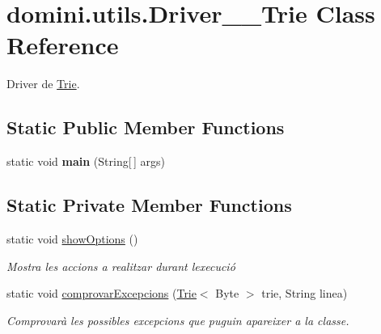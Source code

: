 \hypertarget{classdomini_1_1utils_1_1Driver____Trie}{}\section{domini.\+utils.\+Driver\+\_\+\+\_\+\+Trie Class Reference}
\label{classdomini_1_1utils_1_1Driver____Trie}


Driver de \hyperlink{classdomini_1_1utils_1_1Trie}{Trie}.  


\subsection*{Static Public Member Functions}
\begin{DoxyCompactItemize}
\item 
\mbox{\label{classdomini_1_1utils_1_1Driver____Trie_a00769a23a8d74a6f4bc05c19a2bd8519}} 
static void {\bfseries main} (String\mbox{[}$\,$\mbox{]} args)
\end{DoxyCompactItemize}
\subsection*{Static Private Member Functions}
\begin{DoxyCompactItemize}
\item 
\mbox{\label{classdomini_1_1utils_1_1Driver____Trie_a8b61698744500c2c6ffa92f861162ff5}} 
static void \hyperlink{classdomini_1_1utils_1_1Driver____Trie_a8b61698744500c2c6ffa92f861162ff5}{show\+Options} ()
\begin{DoxyCompactList}\small\item\em Mostra les accions a realitzar durant l\textquotesingle{}execució \end{DoxyCompactList}\item 
static void \hyperlink{classdomini_1_1utils_1_1Driver____Trie_a6fd273250b3951144ce3a76f26330ab1}{comprovar\+Excepcions} (\hyperlink{classdomini_1_1utils_1_1Trie}{Trie}$<$ Byte $>$ trie, String linea)
\begin{DoxyCompactList}\small\item\em Comprovarà les possibles excepcions que puguin apareixer a la classe. \end{DoxyCompactList}\end{DoxyCompactItemize}


